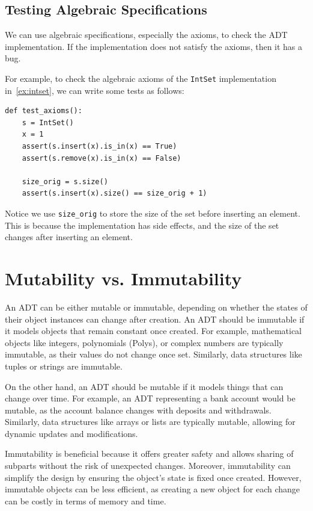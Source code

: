 \documentclass[oneside,11pt,dvipsnames]{book}
\newcommand{\code}[1]{\texttt{#1}}
\begin{document}
\subsection{Testing Algebraic Specifications}

We can use algebraic specifications, especially the axioms, to check the ADT implementation. If the implementation does not satisfy the axioms, then it has a bug.

For example, to check the algebraic axioms of the \code{IntSet} implementation in~\autoref{ex:intset}, we can write some tests as follows:

\begin{lstlisting}
def test_axioms():
    s = IntSet()
    x = 1 
    assert(s.insert(x).is_in(x) == True) 
    assert(s.remove(x).is_in(x) == False)

    size_orig = s.size()
    assert(s.insert(x).size() == size_orig + 1)
\end{lstlisting}


Notice we use \code{size\_orig} to store the size of the set before inserting an element. This is because the implementation has side effects, and the size of the set changes after inserting an element. 




\section{Mutability vs. Immutability}\label{sec:mutability-vs-immutability}

An ADT can be either mutable or immutable, depending on whether the states of their object instances can change after creation. An ADT should be immutable if it models objects that remain constant once created. For example, mathematical objects like integers, polynomials (Polys), or complex numbers are typically immutable, as their values do not change once set. Similarly, data structures like tuples or strings are immutable.

On the other hand, an ADT should be mutable if it models things that can change over time. For example, an ADT representing a bank account would be mutable, as the account balance changes with deposits and withdrawals. Similarly, data structures like arrays or lists are typically mutable, allowing for dynamic updates and modifications.


Immutability is beneficial because it offers greater safety and allows sharing of subparts without the risk of unexpected changes. Moreover, immutability can simplify the design by ensuring the object’s state is fixed once created. However, immutable objects can be less efficient, as creating a new object for each change can be costly in terms of memory and time.
\end{document}
